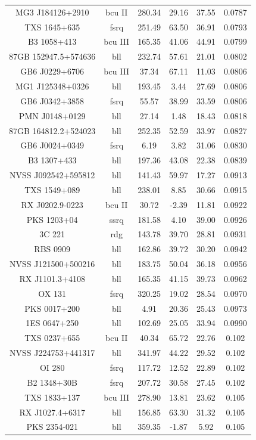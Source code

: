 \begin{center}
\begin{longtable}{||cccccc||}
MG3 J184126+2910 &  bcu II  & 280.34 & 29.16 & 37.55 & 0.0787  \\
TXS 1645+635 &  fsrq  & 251.49 & 63.50 & 36.91 & 0.0793  \\
B3 1058+413 &  bcu III  & 165.35 & 41.06 & 44.91 & 0.0799  \\
87GB 152947.5+574636 &  bll  & 232.74 & 57.61 & 21.01 & 0.0802  \\
GB6 J0229+6706 &  bcu III  & 37.34 & 67.11 & 11.03 & 0.0806  \\
MG1 J125348+0326 &  bll  & 193.45 & 3.44 & 27.69 & 0.0806  \\
GB6 J0342+3858 &  fsrq  & 55.57 & 38.99 & 33.59 & 0.0806  \\
PMN J0148+0129 &  bll  & 27.14 & 1.48 & 18.43 & 0.0818  \\
87GB 164812.2+524023 &  bll  & 252.35 & 52.59 & 33.97 & 0.0827  \\
GB6 J0024+0349 &  fsrq  & 6.19 & 3.82 & 31.06 & 0.0830  \\
B3 1307+433 &  bll  & 197.36 & 43.08 & 22.38 & 0.0839  \\
NVSS J092542+595812 &  bll  & 141.43 & 59.97 & 17.27 & 0.0913  \\
TXS 1549+089 &  bll  & 238.01 & 8.85 & 30.66 & 0.0915  \\
RX J0202.9-0223 &  bcu II  & 30.72 & -2.39 & 11.81 & 0.0922  \\
PKS 1203+04 &  ssrq  & 181.58 & 4.10 & 39.00 & 0.0926  \\
3C 221 &  rdg  & 143.78 & 39.70 & 28.81 & 0.0931  \\
RBS 0909 &  bll  & 162.86 & 39.72 & 30.20 & 0.0942  \\
NVSS J121500+500216 &  bll  & 183.75 & 50.04 & 36.18 & 0.0956  \\
RX J1101.3+4108 &  bll  & 165.35 & 41.15 & 39.73 & 0.0962  \\
OX 131 &  fsrq  & 320.25 & 19.02 & 28.54 & 0.0970  \\
PKS 0017+200 &  bll  & 4.91 & 20.36 & 25.43 & 0.0973  \\
1ES 0647+250 &  bll  & 102.69 & 25.05 & 33.94 & 0.0990  \\
TXS 0237+655 &  bcu II  & 40.34 & 65.72 & 22.76 & 0.102  \\
NVSS J224753+441317 &  bll  & 341.97 & 44.22 & 29.52 & 0.102  \\
OI 280 &  fsrq  & 117.72 & 12.52 & 22.89 & 0.102  \\
B2 1348+30B &  fsrq  & 207.72 & 30.58 & 27.45 & 0.102  \\
TXS 1833+137 &  bcu III  & 278.90 & 13.81 & 23.62 & 0.105  \\
RX J1027.4+6317 &  bll  & 156.85 & 63.30 & 31.32 & 0.105  \\
PKS 2354-021 &  bll  & 359.35 & -1.87 & 5.92 & 0.105  \\
\end{longtable}
\end{center}



